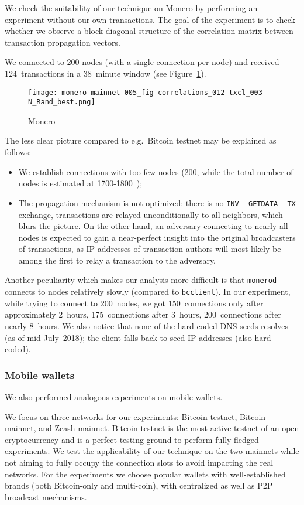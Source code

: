 We check the suitability of our technique on Monero by performing an experiment without our own transactions.
The goal of the experiment is to check whether we observe a block-diagonal structure of the correlation matrix between transaction propagation vectors.

We connected to 200 nodes (with a single connection per node) and received 124~transactions in a 38~minute window (see Figure~\ref{fig:monero}).

\begin{figure}[!t]
	\texttt{[image: monero-mainnet-005\_fig-correlations\_012-txcl\_003-N\_Rand\_best.png]}
	\caption{Monero}
	\label{fig:monero}
\end{figure}

The less clear picture compared to e.g.~Bitcoin testnet may be explained as follows:
\begin{itemize}
	\item We establish connections with too few nodes (200, while the total number of nodes is estimated at 1700-1800~\cite{MoneroHash});
	\item The propagation mechanism is not optimized: there is no \texttt{INV} -- \texttt{GETDATA} -- \texttt{TX} exchange, transactions are relayed unconditionally to all neighbors, which blurs the picture. On the other hand, an adversary connecting to nearly all nodes is expected to gain a near-perfect insight into the original broadcasters of transactions, as IP addresses of transaction authors will most likely be among the first to relay a transaction to the adversary.
\end{itemize}
Another peculiarity which makes our analysis more difficult is that \texttt{monerod} connects to nodes relatively slowly (compared to \texttt{bcclient}).
In our experiment, while trying to connect to 200~nodes, we got 150~connections only after approximately 2~hours, 175~connections after 3~hours, 200~connections after nearly 8~hours.
We also notice that none of the hard-coded DNS seeds resolves (as of mid-July~2018); the client falls back to seed IP addresses (also hard-coded).

\subsubsection{Mobile wallets}

We also performed analogous experiments on mobile wallets.

We focus on three networks for our experiments: Bitcoin testnet, Bitcoin mainnet, and Zcash mainnet.
Bitcoin testnet is the most active testnet of an open cryptocurrency and is a perfect testing ground to perform fully-fledged experiments.
We test the applicability of our technique on the two mainnets while not aiming to fully occupy the connection slots to avoid impacting the real networks.
For the experiments we choose popular wallets with well-established brands (both Bitcoin-only and multi-coin), with centralized as well as P2P broadcast mechanisms.

